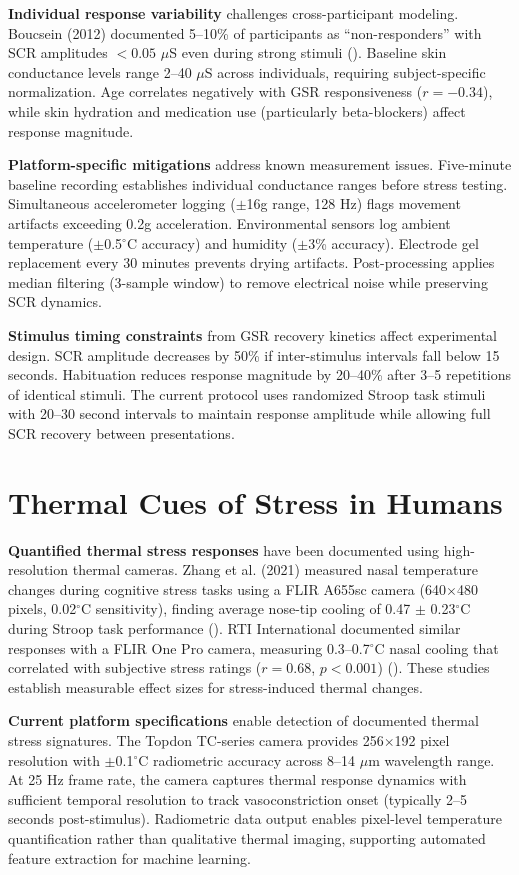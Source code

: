 \textbf{Individual response variability} challenges cross-participant modeling. Boucsein (2012) documented 5--10\% of participants as ``non-responders'' with SCR amplitudes $<0.05$ $\mu$S even during strong stimuli (\citep{ref1}). Baseline skin conductance levels range 2--40 $\mu$S across individuals, requiring subject-specific normalization. Age correlates negatively with GSR responsiveness ($r = -0.34$), while skin hydration and medication use (particularly beta-blockers) affect response magnitude.

\textbf{Platform-specific mitigations} address known measurement issues. Five-minute baseline recording establishes individual conductance ranges before stress testing. Simultaneous accelerometer logging ($\pm$16g range, 128 Hz) flags movement artifacts exceeding 0.2g acceleration. Environmental sensors log ambient temperature ($\pm$0.5$^\circ$C accuracy) and humidity ($\pm$3\% accuracy). Electrode gel replacement every 30 minutes prevents drying artifacts. Post-processing applies median filtering (3-sample window) to remove electrical noise while preserving SCR dynamics.

\textbf{Stimulus timing constraints} from GSR recovery kinetics affect experimental design. SCR amplitude decreases by 50\% if inter-stimulus intervals fall below 15 seconds. Habituation reduces response magnitude by 20--40\% after 3--5 repetitions of identical stimuli. The current protocol uses randomized Stroop task stimuli with 20--30 second intervals to maintain response amplitude while allowing full SCR recovery between presentations.

\section{Thermal Cues of Stress in Humans}
\textbf{Quantified thermal stress responses} have been documented using high-resolution thermal cameras. Zhang et al. (2021) measured nasal temperature changes during cognitive stress tasks using a FLIR A655sc camera (640$\times$480 pixels, 0.02$^\circ$C sensitivity), finding average nose-tip cooling of 0.47 $\pm$ 0.23$^\circ$C during Stroop task performance (\citep{ref5}). RTI International documented similar responses with a FLIR One Pro camera, measuring 0.3--0.7$^\circ$C nasal cooling that correlated with subjective stress ratings ($r = 0.68$, $p < 0.001$) (\citep{ref6}). These studies establish measurable effect sizes for stress-induced thermal changes.

\textbf{Current platform specifications} enable detection of documented thermal stress signatures. The Topdon TC-series camera provides 256$\times$192 pixel resolution with $\pm$0.1$^\circ$C radiometric accuracy across 8--14 $\mu$m wavelength range. At 25 Hz frame rate, the camera captures thermal response dynamics with sufficient temporal resolution to track vasoconstriction onset (typically 2--5 seconds post-stimulus). Radiometric data output enables pixel-level temperature quantification rather than qualitative thermal imaging, supporting automated feature extraction for machine learning.

